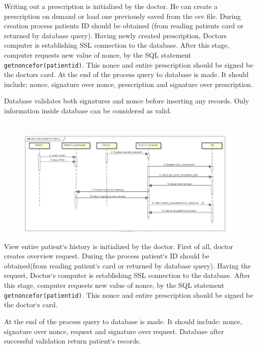 Writing out a prescription is initialized by the doctor. He can create a prescription on demand or load one previously saved from the csv file. During creation process patients ID should be obtained (from reading patients card or returned by database query). Having newly created prescription, Doctors computer is establishing SSL connection to the database. After this stage, computer requests new value of nonce, by the SQL statement  \texttt{getnoncefor(patientid)}.  This nonce and entire prescription should be signed be the doctors card. At the end of the process query to database is made. It should include: nonce, signature over nonce, prescription and signature over prescription.

Database validates both signatures and nonce before inserting any records. Only information inside database can be considered as valid.
\section{}

\begin{figure}[h]
\centering
\includegraphics[width=\textwidth]{doctor/HistoryCheckout.png}
\end{figure} 

View entire patient`s history is initialized by the doctor. First of all, doctor creates overview request. During the process patient`s ID should be obtained(from reading patient`s card or returned by database query). Having the request, Doctor`s computer is establishing SSL connection to the database. After this stage, computer requests new value of nonce, by the SQL statement  \texttt{getnoncefor(patientid)}.  This nonce and entire prescription should be signed be the doctor`s card.

At the end of the process query to database is made. It should include: nonce, signature over nonce, request and signature over request.  Database after successful  validation return patient`s records.



